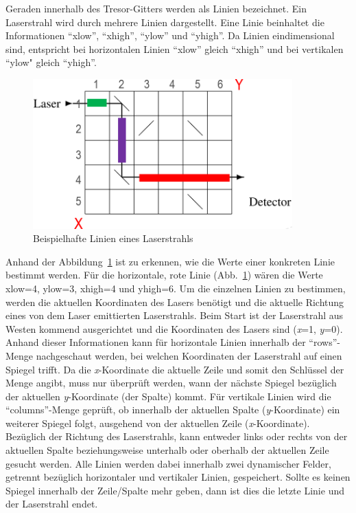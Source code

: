 Geraden innerhalb des Tresor-Gitters werden als Linien bezeichnet. Ein Laserstrahl wird durch mehrere Linien dargestellt. Eine Linie beinhaltet die Informationen “xlow”, “xhigh”, “ylow” und “yhigh”. Da Linien eindimensional sind, entspricht bei horizontalen Linien “xlow” gleich “xhigh” und bei vertikalen “ylow" gleich “yhigh”.
\begin{figure}[h]
    \centering
    \includegraphics[width=10cm]{Bilder2/Abb4.PNG}
    \caption{Beispielhafte Linien eines Laserstrahls}
    \label{fig:enter-label4}
\end{figure}

Anhand der Abbildung~\ref{fig:enter-label4} ist zu erkennen, wie die Werte einer konkreten Linie bestimmt werden. Für die horizontale, rote Linie (Abb.~\ref{fig:enter-label4}) wären die Werte xlow=4, ylow=3, xhigh=4 und yhigh=6. Um die einzelnen Linien zu bestimmen, werden die aktuellen Koordinaten des Lasers benötigt und die aktuelle Richtung eines von dem Laser emittierten Laserstrahls. Beim Start ist der Laserstrahl aus Westen kommend ausgerichtet und die Koordinaten des Lasers sind (\textit{x}=1, \textit{y}=0). Anhand dieser Informationen kann für horizontale Linien innerhalb der “rows”-Menge nachgeschaut werden, bei welchen Koordinaten der Laserstrahl auf einen Spiegel trifft. Da die \textit{x}-Koordinate die aktuelle Zeile und somit den Schlüssel der Menge angibt, muss nur überprüft werden, wann der nächste Spiegel bezüglich der aktuellen \textit{y}-Koordinate (der Spalte) kommt. 
Für vertikale Linien wird die “columns”-Menge geprüft, ob innerhalb der aktuellen Spalte (\textit{y}-Koordinate) ein weiterer Spiegel folgt, ausgehend von der aktuellen Zeile (\textit{x}-Koordinate). Bezüglich der Richtung des Laserstrahls, kann entweder links oder rechts von der aktuellen Spalte beziehungsweise unterhalb oder oberhalb der aktuellen Zeile gesucht werden. Alle Linien werden dabei innerhalb zwei dynamischer Felder, getrennt bezüglich horizontaler und vertikaler Linien, gespeichert. Sollte es keinen Spiegel innerhalb der Zeile/Spalte mehr geben, dann ist dies die letzte Linie und der Laserstrahl endet.

